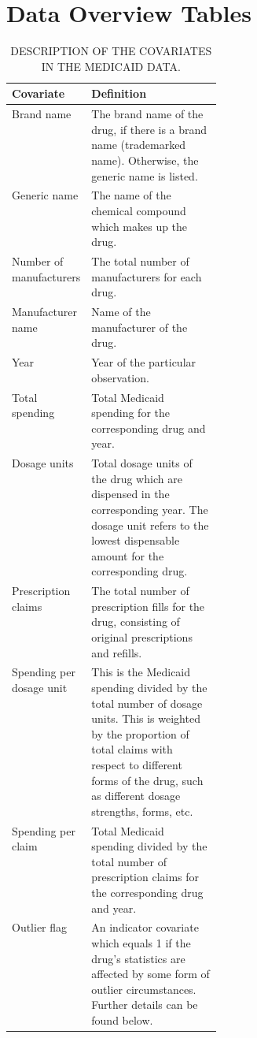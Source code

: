 \section{Data Overview Tables}

\begin{table}[H]
\centering
\caption{\MakeUppercase{Description of the covariates in the Medicaid data.}}
\label{table:table6}
\begin{singlespace}
\begin{minipage}{0.95\linewidth}
\small
\begin{tabularx}{\linewidth}{@{}>{\raggedright\arraybackslash}p{0.31\linewidth}X@{}}

\toprule
Covariate & Definition \tabularnewline
\midrule

Brand name & The brand name of the drug, if there is a brand name (trademarked name). Otherwise, the generic name is listed. \tabularnewline \addlinespace[3pt]

Generic name & The name of the chemical compound which makes up the drug. \tabularnewline \addlinespace[3pt]

Number of manufacturers & The total number of manufacturers for each drug. \tabularnewline \addlinespace[3pt]

Manufacturer name & Name of the manufacturer of the drug. \tabularnewline \addlinespace[3pt]

Year & Year of the particular observation. \tabularnewline \addlinespace[3pt]

Total spending & Total Medicaid spending for the corresponding drug and year. \tabularnewline \addlinespace[3pt]

Dosage units & Total dosage units of the drug which are dispensed in the corresponding year. The dosage unit refers to the lowest dispensable amount for the corresponding drug. \tabularnewline \addlinespace[3pt]

Prescription claims & The total number of prescription fills for the drug, consisting of original prescriptions and refills. \tabularnewline \addlinespace[3pt]

Spending per dosage unit & This is the Medicaid spending divided by the total number of dosage units. This is weighted by the proportion of total claims with respect to different forms of the drug, such as different dosage strengths, forms, etc.\tabularnewline \addlinespace[3pt]

Spending per claim & Total Medicaid spending divided by the total number of prescription claims for the corresponding drug and year. \tabularnewline \addlinespace[3pt]

Outlier flag & An indicator covariate which equals 1 if the drug's statistics are affected by some form of outlier circumstances. Further details can be found below. \tabularnewline

\bottomrule
\end{tabularx}
\end{minipage}
\end{singlespace}
\end{table}





